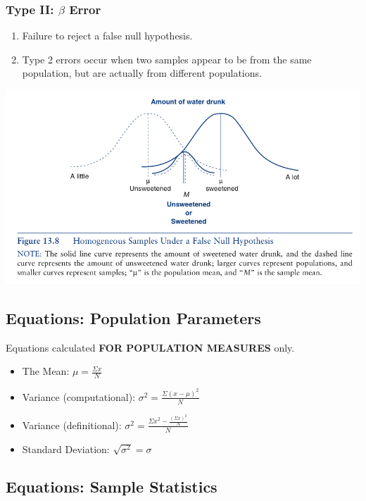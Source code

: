 \documentclass[]{article}
\begin{document}
\subsubsection{Type II: $\beta$ Error}\label{type-ii-beta-error}

\begin{enumerate}
\def\labelenumi{\arabic{enumi}.}
\itemsep1pt\parskip0pt
\item
  Failure to reject a false null hypothesis.
\item
  Type 2 errors occur when two samples appear to be from the same
  population, but are actually from different populations.
\end{enumerate}

\includegraphics{type2.png}

\subsection{Equations: Population
Parameters}\label{equations-population-parameters}

Equations calculated \textbf{FOR POPULATION MEASURES} only.

\begin{itemize}
\itemsep1pt\parskip0pt
\item
  The Mean: $\mu =\frac{\Sigma x}{N}$
\item
  Variance (computational): $\sigma ^2 = \frac{\Sigma(x - \mu)^2}{N}$
\item
  Variance (definitional):
  $\sigma^2 = \frac{\Sigma x^2 - \frac{(\Sigma x)^2}{N}}{N}$
\item
  Standard Deviation: $\sqrt{\sigma^2} = \sigma$
\end{itemize}

\subsection{Equations: Sample
Statistics}\label{equations-sample-statistics}
\end{document}
